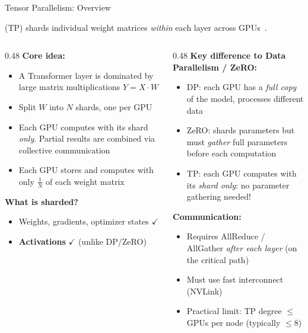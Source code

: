 
\begin{frame}{Tensor Parallelism: Overview}

   (TP) shards individual weight matrices \emph{within} each layer across GPUs~\cite{shoeybi2020megatronlm}.

  \vspace{0.5em}
  \begin{columns}
    \begin{column}{0.48\textwidth}
      \textbf{Core idea:}
      \begin{itemize}
        \item A Transformer layer is dominated by large matrix multiplications $Y = X \cdot W$
        \item Split $W$ into $N$ shards, one per GPU
        \item Each GPU computes with its shard \emph{only}. Partial results are combined via collective communication
        \item Each GPU stores and computes with only $\frac{1}{N}$ of each weight matrix
      \end{itemize}

      \vspace{0.3em}
      \textbf{What is sharded?}
      \begin{itemize}
        \item Weights, gradients, optimizer states $\checkmark$
        \item \textbf{Activations} $\checkmark$ (unlike DP/ZeRO)
      \end{itemize}
    \end{column}
    \begin{column}{0.48\textwidth}
      \textbf{Key difference to Data Parallelism / ZeRO:}
      \begin{itemize}
        \item DP: each GPU has a \emph{full copy} of the model, processes different data
        \item ZeRO: shards parameters but must \emph{gather} full parameters before each computation
        \item TP: each GPU computes with its \emph{shard only}: no parameter gathering needed!
      \end{itemize}

      \vspace{0.3em}
      \textbf{Communication:}
      \begin{itemize}
        \item Requires AllReduce / AllGather \emph{after each layer} (on the critical path)
        \item Must use fast interconnect (NVLink)
        \item Practical limit: TP degree $\leq$ GPUs per node (typically $\leq 8$)
      \end{itemize}
    \end{column}
  \end{columns}
\end{frame}

